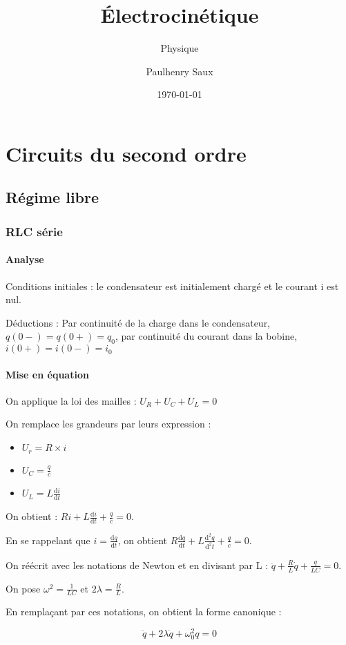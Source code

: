 \documentclass[french]{yLectureNote}
\title{Électrocinétique}
\subtitle{Physique}
\author{Paulhenry Saux}
\date{\today}
\newcommand{\dd}{\mathrm{d}}
\begin{document}
\setcounter{chapter}{4}

\chapter{Circuits du second ordre}
\section{Régime libre}
\subsection{RLC série}
\subsubsection{Analyse}
Conditions initiales : le condensateur est initialement chargé et le courant i est nul.

Déductions : Par continuité de la charge dans le condensateur, \(q(0-) = q(0+)=q_0\), par continuité du courant dans la bobine, \(i(0+)=i(0-)=i_0\)
\subsubsection{Mise en équation}
On applique la loi des mailles : \(U_R+U_C+U_L =0\)

On remplace les grandeurs par leurs expression :
\begin{itemize}
 \item $U_r = R\times i$
 \item $U_C = \frac{q}{c}$
 \item $U_L = L\frac{\dd i}{\dd t}$
\end{itemize}

On obtient : \(Ri+L\frac{\dd i}{\dd t} + \frac{q}{c} = 0\).

En se rappelant que \(i= \frac{\dd q}{\dd t}\), on obtient \(R\frac{\dd q}{\dd t} + L\frac{\dd^2q}{\dd^2t} + \frac{q}{c}=0\).

On réécrit avec les notations de Newton et en divisant par L : \(\ddot{q}+\frac{R}{L}\dot{q}+\frac{q}{LC}=0\).

On pose \(\omega^2 = \frac{1}{LC}\) et \(2\lambda = \frac{R}{L}\).

En remplaçant par ces notations, on obtient la forme canonique :
\begin{theorem}
\[\ddot{q}+2\lambda \dot{q}+\omega^2_0q = 0\]
\end{theorem}
\end{document}
